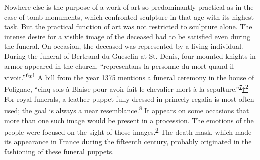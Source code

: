 Nowhere else is the purpose of a work of art so predominantly practical
as in the case of tomb monuments, which confronted sculpture in that age
with its highest task. But the practical function of art was not
restricted to sculpture alone. The intense desire for a visible image of
the deceased had to be satisfied even during the funeral. On occasion,
the deceased was represented by a living individual. During the funeral
of Bertrand du Guesclin at St. Denis, four mounted knights in armor
appeared in the church, ``representans la personne du mort quand il
vivoit.''\textsuperscript{\protect\hypertarget{20_ILLUSTRATIONS_FOLLOW_PAGE.xhtmlux5cux23id_460}{\protect\hyperlink{23_NOTES.xhtmlux5cux23id_461}{6}}}\protect\hypertarget{20_ILLUSTRATIONS_FOLLOW_PAGE.xhtmlux5cux23id_2655}{\protect\hyperlink{23_NOTES.xhtmlux5cux23id_2656}{*\textsuperscript{1}}}
A bill from the year 1375 mentions a funeral ceremony in the house of
Polignac, ``cinq sols à Blaise pour avoir fait le chevalier mort à la
sepulture.''\textsuperscript{\protect\hypertarget{20_ILLUSTRATIONS_FOLLOW_PAGE.xhtmlux5cux23id_458}{\protect\hyperlink{23_NOTES.xhtmlux5cux23id_459}{7}}}\protect\hypertarget{20_ILLUSTRATIONS_FOLLOW_PAGE.xhtmlux5cux23id_2657}{\protect\hyperlink{23_NOTES.xhtmlux5cux23id_2658}{†\textsuperscript{2}}}
For royal funerals, a leather puppet fully dressed in princely regalia
is most often used; the goal is always a near
resemblance.\textsuperscript{\protect\hypertarget{20_ILLUSTRATIONS_FOLLOW_PAGE.xhtmlux5cux23id_456}{\protect\hyperlink{23_NOTES.xhtmlux5cux23id_457}{8}}}
It appears on some occasions that more than one such image would be
present in a procession. The emotions of the people were focused on the
sight of those
images.\textsuperscript{\protect\hypertarget{20_ILLUSTRATIONS_FOLLOW_PAGE.xhtmlux5cux23id_454}{\protect\hyperlink{23_NOTES.xhtmlux5cux23id_455}{9}}}
The death mask, which made its appearance in France during the fifteenth
century, probably originated in the fashioning of these funeral puppets.

